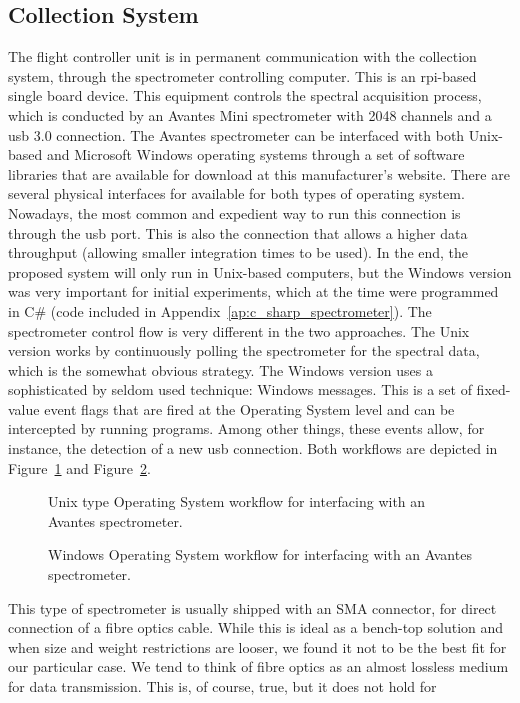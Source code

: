 \subsection{Collection System}%
\label{sub:methods_collection}

The flight controller unit is in permanent communication with the
collection system, through the spectrometer controlling computer. This
is an \gls{rpi}-based single board device. This equipment controls the
spectral acquisition process, which is conducted by an Avantes Mini
spectrometer with 2048 channels and a \gls{usb} 3.0 connection. The
Avantes spectrometer can be interfaced with both Unix-based and
Microsoft Windows operating systems through a set of software libraries
that are available for download at this manufacturer's website. There
are several physical interfaces for available for both types of
operating system. Nowadays, the most common and expedient way to run
this connection is through the \gls{usb} port. This is also the
connection that allows a higher data throughput (allowing smaller
integration times to be used). In the end, the proposed system will only
run in Unix-based computers, but the Windows version was very important
for initial experiments, which at the time were programmed in C\# (code
included in Appendix~\ref{ap:c_sharp_spectrometer}). The spectrometer
control flow is very different in the two approaches. The Unix version
works by continuously polling the spectrometer for the spectral data,
which is the somewhat obvious strategy. The Windows version uses a
sophisticated by seldom used technique: Windows messages. This is a set
of fixed-value event flags that are fired at the Operating System level
and can be intercepted by running programs. Among other things, these
events allow, for instance, the detection of a new \gls{usb} connection.
Both workflows are depicted in
Figure~\ref{fig:unix_spectrometer_workflow} and
Figure~\ref{fig:windows_spectrometer_workflow}. 

\begin{figure}[htpb]
    \centering
    \missingfigure{}
    \caption{Unix type Operating System workflow for interfacing with an
    Avantes spectrometer.}%
    \label{fig:unix_spectrometer_workflow}
\end{figure}

\begin{figure}[htpb]
    \centering
    \missingfigure{}
    \caption{Windows Operating System workflow for interfacing with an
    Avantes spectrometer.}%
    \label{fig:windows_spectrometer_workflow}
\end{figure}

This type of spectrometer is usually shipped with an \gls{SMA}
connector, for direct connection of a fibre optics cable. While this is
ideal as a bench-top solution and when size and weight restrictions are
looser, we found it not to be the best fit for our particular case. We
tend to think of fibre optics as an almost lossless medium for data
transmission. This is, of course, true, but it does not hold for 




